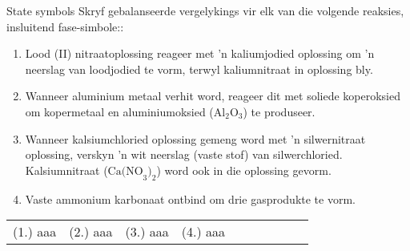 \begin{exercises}{State symbols}
            \nopagebreak
 Skryf gebalanseerde vergelykings vir elk van die volgende reaksies, insluitend fase-simbole::\par 
      \label{m38727*id66796}\begin{enumerate}[noitemsep, label=\textbf{\arabic*}. ] 
        \label{m38727*uid33}\item Lood (II) nitraatoplossing reageer met 'n kaliumjodied oplossing om  'n neerslag van loodjodied te vorm, terwyl kaliumnitraat in oplossing bly.
\label{m38727*uid34}\item Wanneer aluminium metaal verhit word, reageer dit met soliede koperoksied om kopermetaal en  aluminiumoksied (${\text{Al}}_{2}{\text{O}}_{3}$) te produseer.
\label{m38727*uid35}\item Wanneer kalsiumchloried oplossing gemeng word met  'n silwernitraat oplossing, verskyn 'n wit neerslag (vaste stof) van silwerchloried. Kalsiumnitraat ($\text{{Ca(NO}}_{3}\text{)}_{2}$) word ook in die oplossing gevorm.
\item Vaste ammonium karbonaat ontbind om drie gasprodukte te vorm.
        \end{enumerate}
\practiceinfo
 \begin{tabular}[h]{cccccc}
 (1.) aaa &  (2.) aaa &  (3.) aaa &  (4.) aaa &    &   &   &   &   &   & \end{tabular}
\end{exercises}
 
